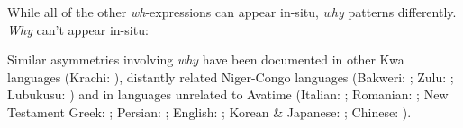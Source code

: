 \documentclass[output=paper]{langscibook}
\begin{document}
While all of the other \textit{wh}-expressions can appear in-situ, \textit{why} patterns differently. \textit{Why} can’t appear in-situ:

\ea  \label{ex:devlin:why-basic}
\begin{xlist}
\end{xlist}
\z

\begin{sloppypar}
Similar asymmetries involving \textit{why} have been documented in other Kwa languages (Krachi: \citealt{torrence2015wh}), distantly related Niger-Congo languages (Bakweri: \citealt{marlo2007exponence}; Zulu: \citealt{buell2011zulu}; Lubukusu: \citealt{wasike2007left}) and in languages unrelated to Avatime (Italian: \citealt{rizzi2001position}; Romanian: \citealt{shlonskysoare}; New Testament Greek: \citealt{kirk2010greek}; Persian: \citealt{karimi2008minimalist}; English: \citealt{hornstein1995logical}; Korean \& Japanese: \citealt{ko2005syntax}; Chinese: \citealt{lin1992syntax}).
\end{sloppypar}
\end{document}
